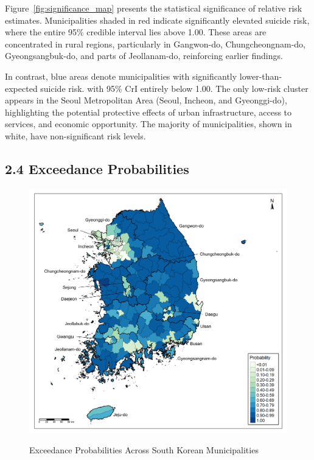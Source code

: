 \documentclass[11pt]{article}
\begin{document}
	Figure~\ref{fig:significance_map} presents the statistical significance of relative risk estimates. Municipalities shaded in red indicate significantly elevated suicide risk, where the entire 95\% credible interval lies above 1.00. These areas are concentrated in rural regions, particularly in Gangwon-do, Chungcheongnam-do, Gyeongsangbuk-do, and parts of Jeollanam-do, reinforcing earlier findings.
	
	In contrast, blue areas denote municipalities with significantly lower-than-expected suicide risk. with 95\% CrI entirely below 1.00. The only low-risk cluster appears in the Seoul Metropolitan Area (Seoul, Incheon, and Gyeonggi-do), highlighting the potential protective effects of urban infrastructure, access to services, and economic opportunity. The majority of municipalities, shown in white, have non-significant risk levels.
	
	\subsection*{2.4 Exceedance Probabilities}
	
	\begin{figure}[H]
		\centering
		\caption{Exceedance Probabilities Across South Korean Municipalities}
		\includegraphics[width=1\textwidth]{assets/exceedance_probabilities/exceedance_probabilities_map_2022_annotated.png}
		\label{fig:exceedance_probabilities_map}
	\end{figure}
	
\end{document}
